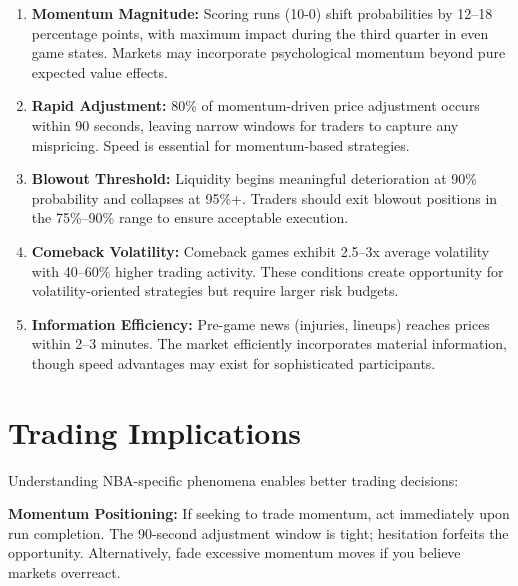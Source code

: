 \begin{keyfindings}
\begin{enumerate}
    \item \textbf{Momentum Magnitude:} Scoring runs (10-0) shift probabilities by 12--18 percentage points, with maximum impact during the third quarter in even game states. Markets may incorporate psychological momentum beyond pure expected value effects.

    \item \textbf{Rapid Adjustment:} 80\% of momentum-driven price adjustment occurs within 90 seconds, leaving narrow windows for traders to capture any mispricing. Speed is essential for momentum-based strategies.

    \item \textbf{Blowout Threshold:} Liquidity begins meaningful deterioration at 90\% probability and collapses at 95\%+. Traders should exit blowout positions in the 75\%--90\% range to ensure acceptable execution.

    \item \textbf{Comeback Volatility:} Comeback games exhibit 2.5--3x average volatility with 40--60\% higher trading activity. These conditions create opportunity for volatility-oriented strategies but require larger risk budgets.

    \item \textbf{Information Efficiency:} Pre-game news (injuries, lineups) reaches prices within 2--3 minutes. The market efficiently incorporates material information, though speed advantages may exist for sophisticated participants.
\end{enumerate}
\end{keyfindings}

\section{Trading Implications}

Understanding NBA-specific phenomena enables better trading decisions:

\textbf{Momentum Positioning:} If seeking to trade momentum, act immediately upon run completion. The 90-second adjustment window is tight; hesitation forfeits the opportunity. Alternatively, fade excessive momentum moves if you believe markets overreact.

